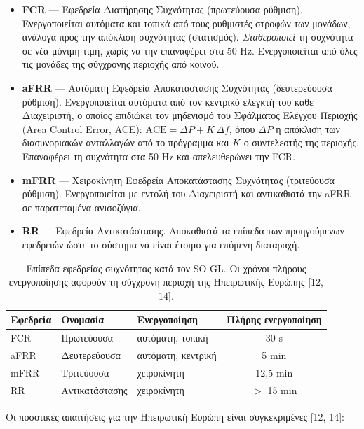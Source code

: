 \begin{itemize}
\item \textbf{FCR} — Εφεδρεία Διατήρησης Συχνότητας (πρωτεύουσα ρύθμιση). Ενεργοποιείται αυτόματα
      και τοπικά από τους ρυθμιστές στροφών των μονάδων, ανάλογα προς την απόκλιση συχνότητας
      (στατισμός). \emph{Σταθεροποιεί} τη συχνότητα σε νέα μόνιμη τιμή, χωρίς να την επαναφέρει
      στα 50 Hz. Ενεργοποιείται από όλες τις μονάδες της σύγχρονης περιοχής από κοινού.
\item \textbf{aFRR} — Αυτόματη Εφεδρεία Αποκατάστασης Συχνότητας (δευτερεύουσα ρύθμιση).
      Ενεργοποιείται αυτόματα από τον κεντρικό ελεγκτή του κάθε Διαχειριστή, ο οποίος επιδιώκει τον
      μηδενισμό του Σφάλματος Ελέγχου Περιοχής (Area Control Error, ACE):
      $\mathrm{ACE} = \Delta P + K\,\Delta f$, όπου $\Delta P$ η απόκλιση των διασυνοριακών
      ανταλλαγών από το πρόγραμμα και $K$ ο συντελεστής της περιοχής. Επαναφέρει τη συχνότητα στα
      50 Hz και απελευθερώνει την FCR.
\item \textbf{mFRR} — Χειροκίνητη Εφεδρεία Αποκατάστασης Συχνότητας (τριτεύουσα ρύθμιση).
      Ενεργοποιείται με εντολή του Διαχειριστή και αντικαθιστά την aFRR σε παρατεταμένα ανισοζύγια.
\item \textbf{RR} — Εφεδρεία Αντικατάστασης. Αποκαθιστά τα επίπεδα των προηγούμενων εφεδρειών ώστε
      το σύστημα να είναι έτοιμο για επόμενη διαταραχή.
\end{itemize}

\begin{table}[!htbp]
\centering
\begin{tabular}{lllc}
\hline
Εφεδρεία & Ονομασία & Ενεργοποίηση & Πλήρης ενεργοποίηση \\
\hline
FCR  & Πρωτεύουσα   & αυτόματη, τοπική  & 30 s \\
aFRR & Δευτερεύουσα & αυτόματη, κεντρική & 5 min \\
mFRR & Τριτεύουσα   & χειροκίνητη        & 12,5 min \\
RR   & Αντικατάστασης & χειροκίνητη      & $>$ 15 min \\
\hline
\end{tabular}
\caption{Επίπεδα εφεδρείας συχνότητας κατά τον SO GL. Οι χρόνοι πλήρους ενεργοποίησης αφορούν
τη σύγχρονη περιοχή της Ηπειρωτικής Ευρώπης [12, 14].}
\label{tab:reserves}
\end{table}

Οι ποσοτικές απαιτήσεις για την Ηπειρωτική Ευρώπη είναι συγκεκριμένες [12, 14]:

